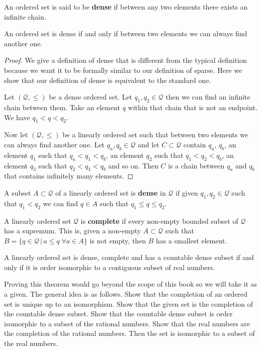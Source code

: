 \begin{mathSection}
	\begin{defn}
		An ordered set is said to be \textbf{dense} if between any two elements there exists an infinite chain.
	\end{defn}
	\begin{coro}
		An ordered set is dense if and only if between two elements we can always find another one.
	\end{coro}
	\begin{proof}
		We give a definition of dense that is different from the typical definition because we want it to be formally similar to our definition of sparse. Here we show that our definition of dense is equivalent to the standard one.
		
		Let $(\mathcal{Q}, \leq)$ be a dense ordered set. Let $q_1, q_2 \in \mathcal{Q}$ then we can find an infinite chain between them. Take an element $q$ within that chain that is not an endpoint. We have $q_1 < q < q_2$.
		
		Now let $(\mathcal{Q}, \leq)$ be a linearly ordered set such that between two elements we can always find another one.  Let $q_a, q_b \in \mathcal{Q}$ and let $C \subset \mathcal{Q}$ contain $q_a$, $q_b$, an element $q_1$ such that $q_a < q_1 < q_b$, an element $q_2$ such that $q_1 < q_2 < q_b$, an element $q_3$ such that $q_2 < q_3 < q_b$ and so on. Then $C$ is a chain between $q_a$ and $q_b$ that contains infinitely many elements.
	\end{proof}
	\begin{defn}
		A subset $A \subset \mathcal{Q}$ of a linearly ordered set is \textbf{dense} in $\mathcal{Q}$ if given $q_1, q_2 \in \mathcal{Q}$ such that $q_1 < q_2$ we can find $q \in A$ such that $q_1 \leq q \leq q_2$.
	\end{defn}
	\begin{defn}
		A linearly ordered set $\mathcal{Q}$ is \textbf{complete} if every non-empty bounded subset of $\mathcal{Q}$ has a supremum. This is, given a non-empty $A \subset \mathcal{Q}$ such that $B = \{ q \in \mathcal{Q} \, | \, a \leq q \; \forall a \in A \}$ is not empty, then $B$ has a smallest element.
	\end{defn}
	\begin{thrm}\label{pm-pq-realOrdering}
		A linearly ordered set is dense, complete and has a countable dense subset if and only if it is order isomorphic to a contiguous subset of real numbers.
	\end{thrm}
	\begin{remark}
		Proving this theorem would go beyond the scope of this book so we will take it as a given. The general idea is as follows. Show that the completion of an ordered set is unique up to an isomorphism. Show that the given set is the completion of the countable dense subset. Show that the countable dense subset is order isomorphic to a subset of the rational numbers. Show that the real numbers are the completion of the rational numbers. Then the set is isomorphic to a subset of the real numbers.
	\end{remark}
\end{mathSection}


